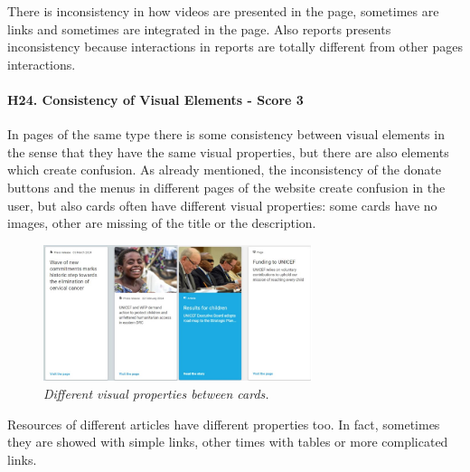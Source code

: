 \newline There is inconsistency in how videos are presented in the page, sometimes are links and sometimes are integrated in the page.
\newline Also reports presents inconsistency because interactions in reports are totally different from other pages interactions.
\newline
\newline \paragraph{H24. Consistency of Visual Elements - Score 3}	In pages of the same type there is some consistency between visual elements in the sense that they have the same visual properties, but there are also elements which create confusion.
\newline As already mentioned, the inconsistency of the donate buttons and the menus in different pages of the website create confusion in the user, but also cards often have different visual properties: some cards have no images, other are missing of the title or the description.
\begin{figure}[!h]
	\begin{center}
		\includegraphics[width=0.7\textwidth]{FinalScores28.jpg}
		\captionsetup{font=small}
		\caption{\textit{Different visual properties between cards.}}
	\end{center}
\end{figure}
\newline Resources of different articles have different properties too. In fact, sometimes they are showed with simple links, other times with tables or more complicated links.
